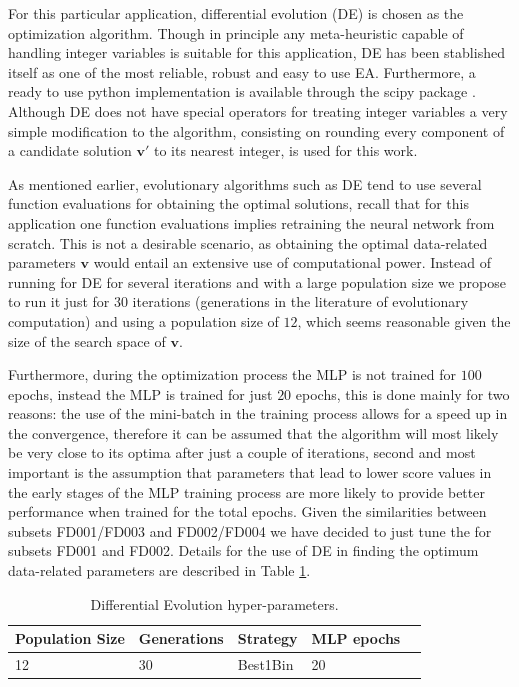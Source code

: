 \documentclass[12pt]{IEEEtran}%
\begin{document}
For this particular application, differential evolution (DE) \cite{Storn1997} is chosen as the optimization algorithm. Though in principle any meta-heuristic capable of handling integer variables is suitable for this application, DE has been stablished itself as one of the most reliable, robust and easy to use EA. Furthermore, a ready to use python implementation is available through the scipy package \cite{scipy}. Although DE does not have special operators for treating integer variables a very simple modification to the algorithm, consisting on rounding every component of a candidate solution $\mathbf{v}'$ to its nearest integer, is used for this work.

As mentioned earlier, evolutionary algorithms such as DE tend to use several function evaluations for obtaining the optimal solutions, recall that for this application one function evaluations implies retraining the  neural network from scratch. This is not a desirable scenario, as obtaining the optimal data-related parameters $\mathbf{v}$ would entail an extensive use of computational power. Instead of running for DE for several iterations and with a large population size we propose to run it just for $30$ iterations (generations in the literature of evolutionary computation) and using a population size of $12$, which seems reasonable given the size of the search space of $\mathbf{v}$. 

Furthermore, during the optimization process the MLP is not trained for  $100$ epochs, instead the MLP is trained for just $20$ epochs, this is done mainly for two reasons: the use of the mini-batch in the training process allows for a speed up in the convergence, therefore it can be assumed that the algorithm will most likely be very close to its optima after just a couple of iterations, second and most important is the assumption that parameters that lead to lower score values in the early stages of the MLP training process are more likely to provide better performance when trained for the total epochs. Given the similarities between subsets FD001/FD003 and FD002/FD004 we have decided to just tune the for subsets FD001 and FD002. Details for the use of DE in finding the optimum data-related parameters are described in Table \ref{table:de_hyperparams}.

\begin{table}[!htb]
\centering
\begin{tabular}{l l l l l}
	\hline
	 Population Size & Generations & Strategy & MLP epochs\\
  	\hline
  	12 & 30 & Best1Bin & 20\\
  	\hline
\end{tabular}
\caption{Differential Evolution hyper-parameters.}
\label{table:de_hyperparams}
\end{table}
\end{document}
